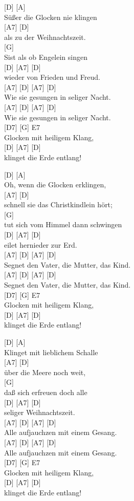 \documentclass[
  letterpaper,
]{scrbook}
\begin{document}
{[}D{]} {[}A{]}\\
Süßer die Glocken nie klingen\\
{[}A7{]} {[}D{]}\\
als zu der Weihnachtszeit.\\
{[}G{]}\\
S\textquotesingle ist als ob Engelein singen\\
{[}D{]} {[}A7{]} {[}D{]}\\
wieder von Frieden und Freud\textquotesingle.\\
{[}A7{]} {[}D{]} {[}A7{]} {[}D{]}\\
Wie sie gesungen in seliger Nacht.\\
{[}A7{]} {[}D{]} {[}A7{]} {[}D{]}\\
Wie sie gesungen in seliger Nacht.\\
{[}D7{]} {[}G{]} E7\\
Glocken mit heiligem Klang,\\
{[}D{]} {[}A7{]} {[}D{]}\\
klinget die Erde entlang!

{[}D{]} {[}A{]}\\
Oh, wenn die Glocken erklingen,\\
{[}A7{]} {[}D{]}\\
schnell sie das Christkindlein hört;\\
{[}G{]}\\
tut sich vom Himmel dann schwingen\\
{[}D{]} {[}A7{]} {[}D{]}\\
eilet hernieder zur Erd\textquotesingle.\\
{[}A7{]} {[}D{]} {[}A7{]} {[}D{]}\\
Segnet den Vater, die Mutter, das Kind.\\
{[}A7{]} {[}D{]} {[}A7{]} {[}D{]}\\
Segnet den Vater, die Mutter, das Kind.\\
{[}D7{]} {[}G{]} E7\\
Glocken mit heiligem Klang,\\
{[}D{]} {[}A7{]} {[}D{]}\\
klinget die Erde entlang!

{[}D{]} {[}A{]}\\
Klinget mit lieblichem Schalle\\
{[}A7{]} {[}D{]}\\
über die Meere noch weit,\\
{[}G{]}\\
daß sich erfreuen doch alle\\
{[}D{]} {[}A7{]} {[}D{]}\\
seliger Weihnachtszeit.\\
{[}A7{]} {[}D{]} {[}A7{]} {[}D{]}\\
Alle aufjauchzen mit einem Gesang.\\
{[}A7{]} {[}D{]} {[}A7{]} {[}D{]}\\
Alle aufjauchzen mit einem Gesang.\\
{[}D7{]} {[}G{]} E7\\
Glocken mit heiligem Klang,\\
{[}D{]} {[}A7{]} {[}D{]}\\
klinget die Erde entlang!
\end{document}
